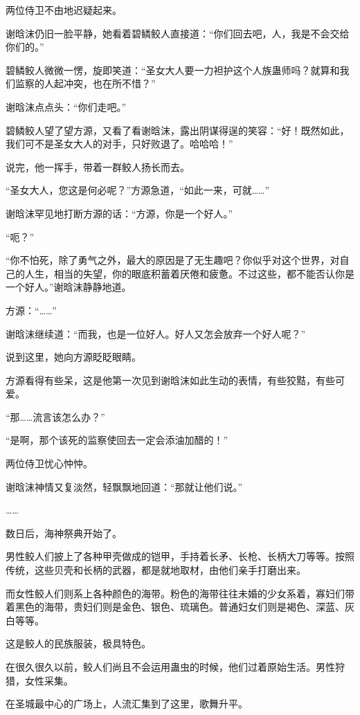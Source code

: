 \begin{this_body}
两位侍卫不由地迟疑起来。

谢晗沫仍旧一脸平静，她看着碧鳞鲛人直接道：“你们回去吧，人，我是不会交给你们的。”

碧鳞鲛人微微一愣，旋即笑道：“圣女大人要一力袒护这个人族蛊师吗？就算和我们监察的人起冲突，也在所不惜？”

谢晗沫点点头：“你们走吧。”

碧鳞鲛人望了望方源，又看了看谢晗沫，露出阴谋得逞的笑容：“好！既然如此，我们可不是圣女大人的对手，只好败退了。哈哈哈！”

说完，他一挥手，带着一群鲛人扬长而去。

“圣女大人，您这是何必呢？”方源急道，“如此一来，可就……”

谢晗沫罕见地打断方源的话：“方源，你是一个好人。”

“呃？”

“你不怕死，除了勇气之外，最大的原因是了无生趣吧？你似乎对这个世界，对自己的人生，相当的失望，你的眼底积蓄着厌倦和疲惫。不过这些，都不能否认你是一个好人。”谢晗沫静静地道。

方源：“……”

谢晗沫继续道：“而我，也是一位好人。好人又怎会放弃一个好人呢？”

说到这里，她向方源眨眨眼睛。

方源看得有些呆，这是他第一次见到谢晗沫如此生动的表情，有些狡黠，有些可爱。

“那……流言该怎么办？”

“是啊，那个该死的监察使回去一定会添油加醋的！”

两位侍卫忧心忡忡。

谢晗沫神情又复淡然，轻飘飘地回道：“那就让他们说。”

……

数日后，海神祭典开始了。

男性鲛人们披上了各种甲壳做成的铠甲，手持着长矛、长枪、长柄大刀等等。按照传统，这些贝壳和长柄的武器，都是就地取材，由他们亲手打磨出来。

而女性鲛人们则系上各种颜色的海带。粉色的海带往往未婚的少女系着，寡妇们带着黑色的海带，贵妇们则是金色、银色、琉璃色。普通妇女们则是褐色、深蓝、灰白等等。

这是鲛人的民族服装，极具特色。

在很久很久以前，鲛人们尚且不会运用蛊虫的时候，他们过着原始生活。男性狩猎，女性采集。

在圣城最中心的广场上，人流汇集到了这里，歌舞升平。


\end{this_body}
